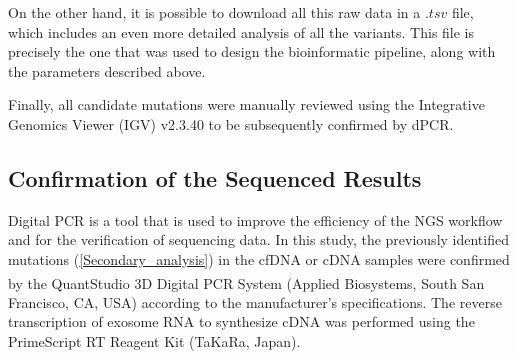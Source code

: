 On the other hand, it is possible to download all this raw data in a $.tsv$ file, which includes an even more detailed analysis of all the variants. This file is precisely the one that was used to design the bioinformatic pipeline, along with the parameters described above.

Finally, all candidate mutations were manually reviewed using the Integrative Genomics Viewer (IGV) v2.3.40 to be subsequently confirmed by dPCR.

\subsection{Confirmation of the Sequenced Results}

Digital PCR is a tool that is used to improve the efficiency of the NGS workflow and for the verification of sequencing data. In this study, the previously identified mutations (\autoref{Secondary_analysis}) in the cfDNA or cDNA samples were confirmed by the QuantStudio\textsuperscript\textregistered{} 3D Digital PCR System (Applied Biosystems, South San Francisco, CA, USA) according to the manufacturer's specifications. The reverse transcription of exosome RNA to synthesize cDNA was performed using the PrimeScript\texttrademark{} RT Reagent Kit (TaKaRa, Japan).

